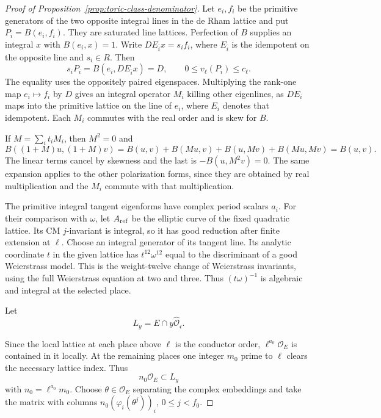 \begin{proof}[Proof of Proposition~\ref{prop:toric-class-denominator}]
Let \(e_i,f_i\) be the primitive generators of the two
opposite integral lines in the de Rham lattice and put
\(P_i=B(e_i,f_i)\). They are saturated line lattices.
Perfection of \(B\) supplies an integral \(x\) with
\(B(e_i,x)=1\). Write \(D E_{\bar i}x=s_i f_i\), where
\(E_{\bar i}\) is the idempotent on the opposite line and
\(s_i\in R\). Then
\[
      s_iP_i=B(e_i,D E_{\bar i}x)=D ,
      \qquad 0\le v_\ell(P_i)\le c_\ell .
\]
The equality uses the oppositely paired eigenspaces.
Multiplying the rank-one map \(e_i\mapsto f_i\) by \(D\)
gives an integral operator \(M_i\) killing other eigenlines,
as \(D E_i\) maps into the primitive lattice on the
line of \(e_i\), where \(E_i\) denotes that idempotent.
Each \(M_i\) commutes with the real order and is skew for \(B\).

If \(M=\sum_i t_i M_i\), then \(M^2=0\) and
\[
 B((1+M)u,(1+M)v)
  =B(u,v)+B(Mu,v)+B(u,Mv)+B(Mu,Mv)=B(u,v).
\]
The linear terms cancel by skewness and the last is
\(-B(u,M^2v)=0\). The same expansion applies to the other
polarization forms, since they are obtained by real
multiplication and the \(M_i\) commute with that multiplication.

The primitive integral tangent eigenforms have
complex period scalars \(a_i\). For their comparison
with \(\omega\), let \(A_{\rm ref}\) be the elliptic curve
of the fixed quadratic lattice. Its CM \(j\)-invariant
is integral, so it has good reduction after finite
extension at \(\ell\). Choose an integral generator of
its tangent line. Its analytic coordinate \(t\) in the
given lattice has \(t^{12}\omega^{12}\) equal to the
discriminant of a good Weierstrass model. This is the
weight-twelve change of Weierstrass invariants, using
the full Weierstrass equation at two and three.
Thus \((t\omega)^{-1}\) is algebraic and integral at
the selected place.

Let
\[
 L_y=E\cap y\widehat{\mathcal O}_{\mathfrak c}.
\]

Since the local lattice at each place above \(\ell\)
is the conductor order, \(\ell^{a_0}\mathcal O_E\)
is contained in it locally. At the remaining places
one integer \(m_0\) prime to \(\ell\) clears the
necessary lattice index. Thus
\[
 n_0\mathcal O_E\subset L_y
\]
with
\(n_0=\ell^{a_0}m_0\). Choose \(\theta\in\mathcal O_E\)
separating the complex embeddings and take the
matrix with columns \(n_0(\varphi_i(\theta^j))_i\),
\(0\le j<f_0\).


\end{proof}
